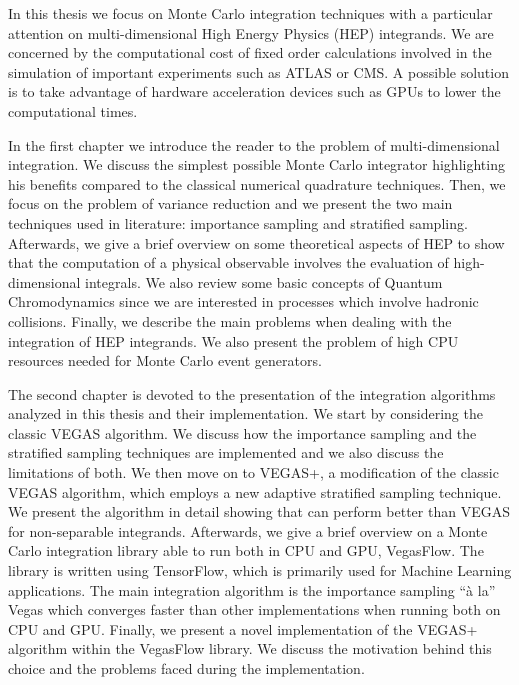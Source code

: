 \documentclass[12pt]{article}
\begin{document}
In this thesis we focus on Monte Carlo integration techniques with a particular attention on multi-dimensional High Energy Physics (HEP) integrands.
We are concerned by the computational cost of fixed order calculations involved in the simulation of important experiments such as ATLAS or CMS. A possible solution is to take advantage of hardware acceleration devices such as GPUs to lower the computational times.


In the first chapter we introduce the reader to the problem of multi-dimensional integration. We discuss the simplest possible Monte Carlo integrator highlighting his benefits compared to the classical numerical quadrature techniques. Then, we focus on the problem of variance reduction and we present the two main techniques used in literature: importance sampling and stratified sampling.
Afterwards, we give a brief overview on some theoretical aspects of HEP to show that the computation of a physical observable involves the evaluation of high-dimensional integrals. We also review some basic concepts of Quantum Chromodynamics since we are interested in processes which involve hadronic collisions.
Finally, we describe the main problems when dealing with the integration of HEP integrands. We also present the problem of high CPU resources needed for Monte Carlo event generators.


The second chapter is devoted to the presentation of the integration algorithms analyzed in this thesis and their implementation.
We start by considering the classic VEGAS algorithm. We discuss how the importance sampling and the stratified sampling techniques are implemented and we also discuss the limitations of both. We then move on to VEGAS+, a modification of the classic VEGAS algorithm, which employs a new adaptive stratified sampling technique. We present the algorithm in detail showing that can perform better than VEGAS for non-separable integrands.
Afterwards, we give a brief overview on a Monte Carlo integration library able to run both in CPU and GPU, VegasFlow. The library is written using TensorFlow, which is primarily used for
Machine Learning applications. The main integration algorithm is the importance sampling “à la” Vegas which converges faster than other implementations when running both on CPU and GPU.
Finally, we present a novel implementation of the VEGAS+ algorithm within the VegasFlow library. We discuss the motivation behind this choice and the problems faced during the implementation.
\end{document}
